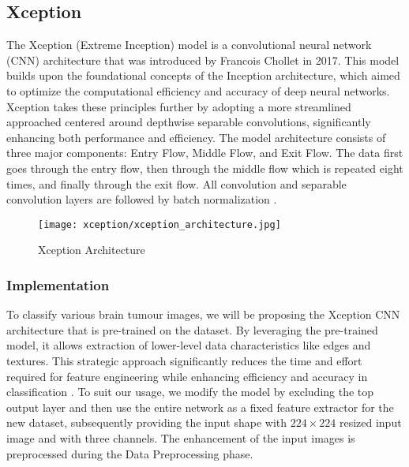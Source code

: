 \subsection{Xception}\label{xception}


The Xception (Extreme Inception) model is a convolutional neural network (CNN) architecture that was introduced by Francois Chollet in 2017. This model builds upon the foundational concepts of the Inception architecture, which aimed to optimize the computational efficiency and accuracy of deep neural networks. Xception takes these principles further by adopting a more streamlined approached centered around depthwise separable convolutions, significantly enhancing both performance and efficiency. The model architecture consists of three major components: Entry Flow, Middle Flow, and Exit Flow. The data first goes through the entry flow, then through the middle flow which is repeated eight times, and finally through the exit flow. All convolution and separable convolution layers are followed by batch normalization \cite{Francois_Chollet}.

\begin{figure}[H]
  \begin{center}
    \texttt{[image: xception/xception\_architecture.jpg]}
  \end{center}
  \caption{Xception Architecture}\label{f:xception_architecture}
\end{figure}

\subsubsection{Implementation}

To classify various brain tumour images, we will be proposing the Xception CNN architecture that is pre-trained on the \cite{ImageNet} dataset. By leveraging the pre-trained model, it allows extraction of lower-level data characteristics like edges and textures. This strategic approach significantly reduces the time and effort required for feature engineering while enhancing efficiency and accuracy in classification \cite{Pre-trainedModel}. To suit our usage, we modify the model by excluding the top output layer and then use the entire network as a fixed feature extractor for the new dataset, subsequently providing the input shape with $224\times224$ resized input image and with three channels. The enhancement of the input images is preprocessed during the Data Preprocessing phase.

